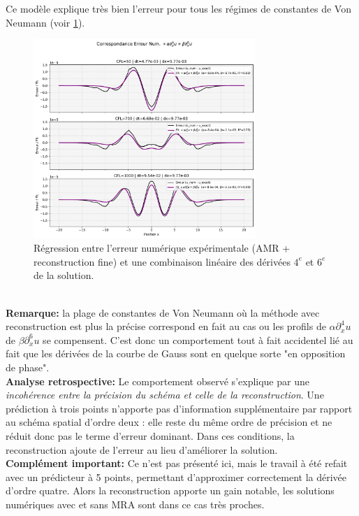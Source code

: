 Ce modèle explique très bien l'erreur pour tous les régimes de constantes de Von Neumann (voir \ref{fig:derivees_vs_err}).
\begin{figure}[h!]
    \centering
    \includegraphics[width=0.75\textwidth]{media/4_travail/3/derivees_spatiales_VS_err_num.pdf}
    \caption{Régression entre l'erreur numérique expérimentale (AMR + reconstruction fine) et une combinaison linéaire des dérivées $4^e$ et $6^e$ de la solution.}
    \label{fig:derivees_vs_err}
\end{figure}\\
\textbf{Remarque:} la plage de constantes de Von Neumann où la méthode avec reconstruction est plus la précise correspond en fait au cas ou les profils de $ \alpha \partial_x^4 u$
de $\beta \partial_x^6 u$ se compensent. C'est donc un comportement tout à fait accidentel lié au fait que les dérivées de la courbe de Gauss sont en quelque sorte "en opposition de phase".\\
\textbf{Analyse retrospective:} Le comportement observé s'explique par une \emph{incohérence entre la précision du schéma et celle de la reconstruction}.
Une prédiction à trois points n'apporte pas d'information supplémentaire par rapport au schéma spatial d'ordre deux :
elle reste du même ordre de précision et ne réduit donc pas le terme d'erreur dominant.
Dans ces conditions, la reconstruction ajoute de l'erreur au lieu d'améliorer la solution.\\
\textbf{Complément important:} Ce n'est pas présenté ici, mais le travail à été refait avec un prédicteur à 5 points, permettant d'approximer correctement la dérivée d'ordre quatre.
Alors la reconstruction apporte un gain notable, les solutions numériques avec et sans MRA sont dans ce cas très proches.